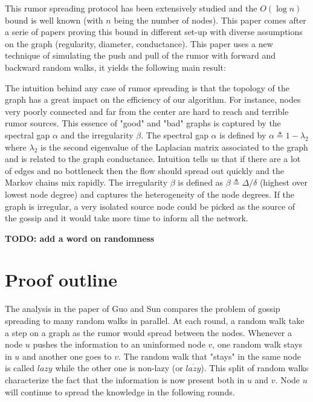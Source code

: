 \documentclass[10pt,journal,a4paper]{IEEEtran}
\begin{document}
This rumor spreading protocol has been extensively studied and the $O(\log n)$ bound is well known (with $n$ being the number of nodes). This paper comes after a serie of papers proving this bound in different set-up with diverse assumptions on the graph (regularity, diameter, conductance). This paper uses a new technique of simulating the push and pull of the rumor with forward and backward random walks, it yields the following main result:

\vspace{.3cm}
\noindent{}
\vspace{.3cm}

The intuition behind any case of rumor spreading is that the topology of the graph has a great impact on the efficiency of our algorithm. For instance, nodes very poorly connected and far from the center are hard to reach and terrible rumor sources. This essence of "good" and "bad" graphs is captured by the spectral gap $\alpha$ and the irregularity $\beta$. The spectral gap $\alpha$ is defined by $\alpha \triangleq 1 - \lambda_2$ where $\lambda_2$ is the second eigenvalue of the Laplacian matrix associated to the graph \cite{jerrum} and is related to the graph conductance. Intuition tells us that if there are a lot of edges and no bottleneck then the flow should spread out quickly and the Markov chains mix rapidly. The irregularity $\beta$ is defined as $\beta \triangleq \Delta/\delta$ (highest over lowest node degree) and captures the heterogeneity of the node degrees. If the graph is  irregular, a very isolated source node could be picked as the source of the gossip and it would take more time to inform all the network.

\textbf{TODO: add a word on randomness}

\section{Proof outline}

The analysis in the paper of Guo and Sun \cite{guosun} compares the problem of gossip spreading to many random walks in parallel. At each round, a random walk take a step on a graph as the rumor would spread between the nodes. Whenever a node $u$ pushes the information to an uninformed node $v$, one random walk stays in $u$ and another one goes to $v$. The random walk that "stays" in the same node is called $lazy$ while the other one is non-lazy (or $\overline{lazy}$). This split of random walks characterize the fact that the information is now present both in $u$ and $v$. Node $u$ will continue to spread the knowledge in the following rounds.
\end{document}

